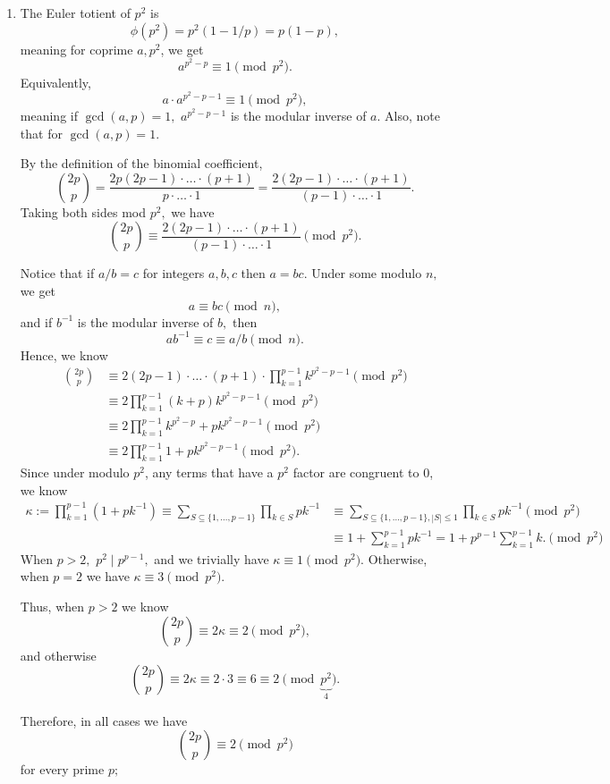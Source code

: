 \documentclass[12pt]{article}
\begin{document}
\begin{enumerate}
  \item[9] The Euler totient of $p^2$ is
    $$
    \phi(p^2) = p^2 \left(1 - 1/p\right) = p(1-p),
    $$
    meaning for coprime $a, p^2$, we get
    $$
    a^{p^2 - p} \equiv 1 \pmod {p^2}.
    $$
    Equivalently,
    $$
    a \cdot a^{p^2 - p - 1} \equiv 1\pmod {p^2},
    $$
    meaning if $\gcd(a, p) = 1,$ $a^{p^2 - p - 1}$ is the modular
    inverse of $a.$ Also, note that for $\gcd(a, p) = 1.$

    By the definition of the binomial coefficient,
    $$
    {2p \choose p} = \dfrac{2p(2p-1) \cdot \ldots \cdot  (p + 1)}{p
    \cdot \ldots \cdot 1} = \dfrac{2(2p - 1) \cdot \ldots \cdot (p +
    1)}{(p- 1) \cdot \ldots \cdot 1}.
    $$
    Taking both sides mod $p^2,$ we have
    $$
    {2p \choose p} \equiv \dfrac{2(2p-1) \cdot \ldots \cdot (p +
    1)}{(p-1) \cdot \ldots \cdot 1} \pmod {p^2}.
    $$

    Notice that if $a / b = c$ for integers $a, b, c$ then $a = bc.$
    Under some modulo $n,$ we get
    $$
    a \equiv bc \pmod n,
    $$
    and if $b^{-1}$ is the modular inverse of $b,$ then
    $$
    ab^{-1} \equiv c \equiv a /b \pmod n.
    $$
    Hence, we know
    \begin{align*}
      {2p \choose p} &\equiv 2(2p-1) \cdot  \ldots \cdot (p + 1)
      \cdot \prod_{k = 1}^{p-1} k^{p^2 - p - 1} \pmod {p^2} \\
      &\equiv 2 \prod_{k = 1}^{p-1} (k+p)k^{p^2 - p - 1} \pmod {p^2} \\
      &\equiv 2 \prod_{k = 1}^{p-1} k^{p^2 - p} + pk^{p^2 -p - 1} \pmod {p^2} \\
      &\equiv 2 \prod_{k = 1}^{p-1}1 + pk^{p^2 -p - 1} \pmod {p^2}.
    \end{align*}
    Since under modulo $p^2$, any terms that have a $p^2$ factor are
    congruent to $0$, we know
    \begin{align*}
      \kappa :=\prod_{k = 1}^{p - 1}(1 + pk^{-1}) \equiv \sum_{S
      \subseteq \{1, \ldots, p-1\}} \prod_{k \in S} pk^{-1} &\equiv
      \sum_{S \subseteq \{1, \ldots, p-1\}, |S| \leq  1} \prod_{k \in
      S} pk^{-1} \pmod{p^2} \\
      &\equiv 1 + \sum_{k = 1}^{p-1} pk^{-1} =  1 + p^{p-1} \sum_{k =
      1}^{p -1} k. \pmod{p^2}
    \end{align*}
    When $p > 2,$ $p^2 \mid p^{p-1},$ and we trivially have $\kappa
    \equiv 1 \pmod {p^2}.$ Otherwise, when $p = 2$ we have $\kappa
    \equiv 3 \pmod {p^{2}}.$

    Thus, when $p > 2$ we know
    $$
    {2p \choose p} \equiv 2 \kappa \equiv 2 \pmod {p^2},
    $$
    and otherwise $$
    {2p \choose p } \equiv 2 \kappa \equiv 2 \cdot 3 \equiv 6
    \equiv 2 \pmod{\underbrace{p^2}_{4}}.
    $$

    Therefore, in all cases we have
    $$
    {2p \choose p} \equiv 2 \pmod{p^2}
    $$
    for every prime $p;$
\end{enumerate}
\end{document}
